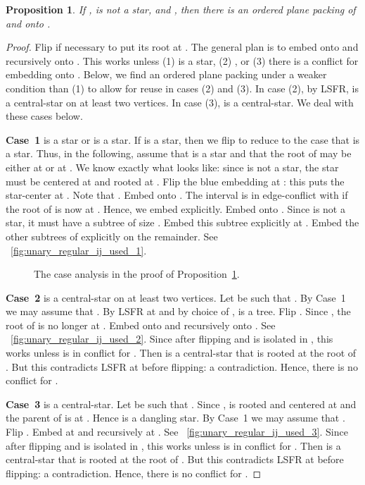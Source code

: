 \documentclass[11pt,a4paper,colorlinks=true,urlcolor=blue,citecolor=red]{article}
\theoremstyle{plain}
\newtheorem{proposition}[theorem]{Proposition}
\newcommand{\case}[1]{\par\vspace{.5\baselineskip}\noindent\textbf{\sffamily Case~#1}}
\begin{document}
\begin{proposition}\label{prop:rec_unary_regular_ij_used}
  If ,  is not a star, and ,
  then there is an ordered plane packing of  and  onto .
\end{proposition}
\begin{proof}
  Flip  if necessary to put its root at . The general plan is
  to embed  onto  and  recursively onto . This works
  unless (1)  is a star, (2) , or (3) there
  is a conflict for embedding  onto . Below, we find an ordered
  plane packing under a weaker condition than (1) to allow for reuse in
  cases (2) and (3).
  In case (2), by LSFR,  is a central-star on at
  least two vertices. In case (3),  is a
  central-star. We deal with these cases below.

  \case{1}  is a star or  is a star. If 
  is a star, then we flip  to reduce to the case that
   is a star. Thus, in the following, assume that 
  is a star and that the root of  may be either at  or at
  . We know exactly what  looks like: since  is not a
  star, the star  must be centered at  and rooted at .
  Flip the blue embedding at : this puts the star-center at
  . Note that . Embed  onto . The
  interval  is in edge-conflict with  if the root of
   is now at . Hence, we embed  explicitly. Embed 
  onto . Since  is not a star, it must have a subtree of size
  . Embed this subtree explicitly at . Embed the
  other subtrees of  explicitly on the remainder. See
  \figurename~\ref{fig:unary_regular_ij_used_1}.

  \begin{figure}[t]
    \centering
    \hfil
    \hfil
    \hfil
    \caption{The case analysis in the proof of
      Proposition~\ref{prop:rec_unary_regular_ij_used}.}
    \label{fig:unary_regular}
  \end{figure}

  \case{2}  is a central-star on at least two
  vertices. Let  be such that . By Case~1
  we may assume that . By LSFR at  and by choice of ,
   is a tree. Flip . Since , the root of
   is no longer at . Embed  onto  and  recursively onto
  . See \figurename~\ref{fig:unary_regular_ij_used_2}. Since
   after flipping and  is isolated in
  , this works unless  is in conflict for . Then
   is a central-star that is rooted at the root of
  . But this contradicts LSFR at  before flipping: a
  contradiction. Hence, there is no conflict for .

  \case{3}  is a central-star. Let  be such
  that . Since ,
   is rooted and centered at  and the parent of  is at
  . Hence  is a dangling star. By Case~1 we may assume that
  . Flip . Embed  at  and  recursively at
  . See \figurename~\ref{fig:unary_regular_ij_used_3}. Since
   after flipping and  is isolated in
  , this works unless  is in conflict for . Then
   is a central-star that is rooted at the root of
  . But this contradicts LSFR at  before flipping: a
  contradiction. Hence, there is no conflict for .
\end{proof}
\end{document}
